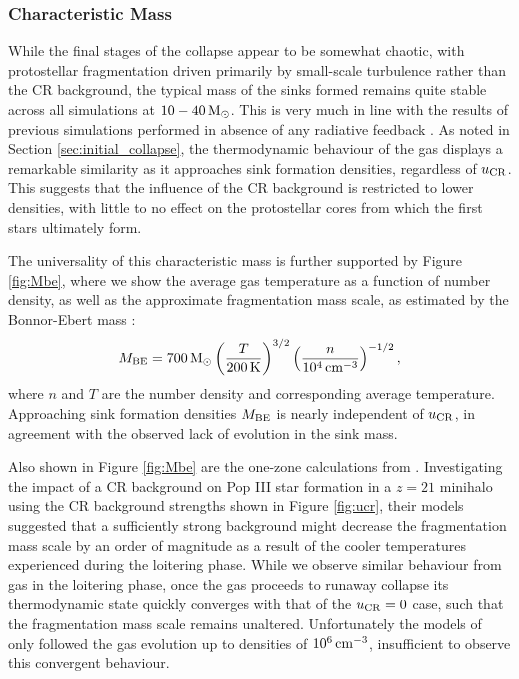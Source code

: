 \documentclass[usenatbib]{mn2e}
\newcommand{\kelvin}{\,{\rm K}}
\newcommand{\cc}{\,{\rm cm}^{-3}}
\newcommand{\msun}{\,{\rm M}_{\odot}}
\newcommand{\ucr}{{u}_{\rm \small CR}}
\begin{document}
\subsubsection{Characteristic Mass}

While the final stages of the collapse appear to be somewhat chaotic, with protostellar fragmentation driven primarily by small-scale turbulence rather than the CR background, the typical mass of the sinks formed remains quite stable across all simulations at $10-40\msun$.
This is very much in line with the results of previous simulations performed in absence of any radiative feedback \citep{Bromm2013}.
As noted in Section \ref{sec:initial_collapse}, the thermodynamic behaviour of the gas displays a remarkable similarity as it approaches sink formation densities, regardless of $\ucr$.
This suggests that the influence of the CR background is restricted to lower densities, with little to no effect on the protostellar cores from which the first stars ultimately form.

The universality of this characteristic mass is further supported by Figure \ref{fig:Mbe}, where we show the average gas temperature as a function of number density, as well as the approximate fragmentation mass scale, as estimated by the Bonnor-Ebert mass \citep[e.g.,][]{StacyBromm2007}:
\begin{equation}
    M_{\rm \small BE} = 700\msun \left(\frac{T}{200\kelvin}\right)^{3/2}
                                 \left(\frac{n}{10^4\cc}   \right)^{-1/2},
\end{equation}
where $n$ and $T$ are the number density and corresponding average temperature.
Approaching sink formation densities $M_{\rm \small BE}$ is nearly independent of $\ucr$, in agreement with the observed lack of evolution in the sink mass.

Also shown in Figure \ref{fig:Mbe} are the one-zone calculations from \citet{StacyBromm2007}.
Investigating the impact of a CR background on Pop III star formation in a $z=21$ minihalo using the CR background strengths shown in Figure \ref{fig:ucr}, their models suggested 
that a sufficiently strong background might decrease the fragmentation mass scale by an order of magnitude as a result of the cooler temperatures experienced during the loitering phase.
While we observe similar behaviour from gas in the loitering phase, once the gas proceeds to runaway collapse its thermodynamic state quickly converges with that of the $\ucr=0$ case, such that the fragmentation mass scale remains unaltered.
Unfortunately the models of \citet{StacyBromm2007} only followed the gas evolution up to densities of $10^6\cc$, insufficient to observe this convergent behaviour.
\end{document}
